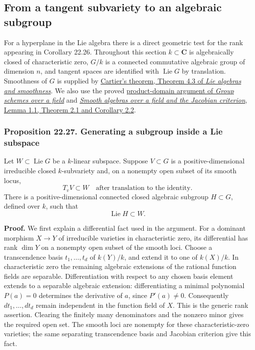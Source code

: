 \documentclass[
  11pt,
  a4paper,
]{article}
\newcounter{none} %
\begin{document}
\subsection{From a tangent subvariety to an algebraic
subgroup}\label{from-a-tangent-subvariety-to-an-algebraic-subgroup}

For a hyperplane in the Lie algebra there is a direct geometric test for
the rank appearing in Corollary 22.26. Throughout this section
\(k\subset\mathbf C\) is algebraically closed of characteristic zero,
\(G/k\) is a connected commutative algebraic group of dimension \(n\),
and tangent spaces are identified with \(\operatorname{Lie}G\) by
translation. Smoothness of \(G\) is supplied by
\href{https://kokunoyumeto.github.io/open-math-courses-public/courses/AG-GS/AG-GS-02.html\#4-why-characteristic-zero-forces-smoothness}{Cartier's
theorem, Theorem 4.3 of \emph{Lie algebras and smoothness}}. We also use
the proved
\href{https://kokunoyumeto.github.io/open-math-courses-public/courses/AG-GS/AG-GS-03.html\#gs03-algebraically-closed-products}{product-domain
argument of \emph{Group schemes over a field}} and
\href{https://kokunoyumeto.github.io/open-math-courses-public/courses/AG-CA/AG-CA-18.html}{\emph{Smooth algebras over a field and
the Jacobian criterion}, Lemma 1.1, Theorem 2.1 and Corollary 2.2}.

\subsubsection{Proposition 22.27. Generating a subgroup inside a Lie
subspace}\label{proposition-22.27.-generating-a-subgroup-inside-a-lie-subspace}

Let \(W\subset\operatorname{Lie}G\) be a \(k\)-linear subspace. Suppose
\(V\subset G\) is a positive-dimensional irreducible closed
\(k\)-subvariety and, on a nonempty open subset of its smooth locus, \[
 T_vV\subset W
 \quad\text{after translation to the identity}.
 \tag{22.68}
\] There is a positive-dimensional connected closed algebraic subgroup
\(H\subset G\), defined over \(k\), such that \[
 \operatorname{Lie}H\subset W.
 \tag{22.69}
\]

\textbf{Proof.} We first explain a differential fact used in the
argument. For a dominant morphism \(X\to Y\) of irreducible varieties in
characteristic zero, its differential has rank \(\dim Y\) on a nonempty
open subset of the smooth loci. Choose a transcendence basis
\(t_1,\ldots,t_d\) of \(k(Y)/k\), and extend it to one of \(k(X)/k\). In
characteristic zero the remaining algebraic extensions of the rational
function fields are separable. Differentiation with respect to any
chosen basis element extends to a separable algebraic extension:
differentiating a minimal polynomial \(P(a)=0\) determines the
derivative of \(a\), since \(P'(a)\ne0\). Consequently
\(dt_1,\ldots,dt_d\) remain independent in the function field of \(X\).
This is the generic rank assertion. Clearing the finitely many
denominators and the nonzero minor gives the required open set. The
smooth loci are nonempty for these characteristic-zero varieties; the
same separating transcendence basis and Jacobian criterion give this
fact.
\end{document}
